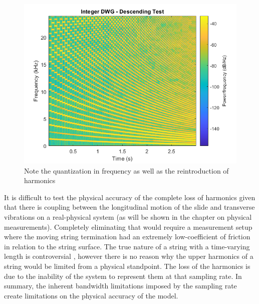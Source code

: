 \documentclass[../main.tex]{subfiles}
\begin{document}
\begin{figure}[h]
    \centering
    \includegraphics[scale=.65]{./images/plots/StringDWGIntDesc.png}
    \caption{Note the quantization in frequency as well as the reintroduction of harmonics}
    \label{fig:StringDWGIntDesc}
\end{figure}

It is difficult to test the physical accuracy of the complete loss of harmonics given that there is coupling between the longitudinal motion of the slide and transverse vibrations on a real-physical system (as will be shown in the chapter on physical measurements). Completely eliminating that would require a measurement setup where the moving string termination had an extremely low-coefficient of friction in relation to the string surface. The true nature of a string with a time-varying length is controversial , however there is no reason why the upper harmonics of a string would be limited from a physical standpoint. The loss of the harmonics is due to the inability of the system to represent them at that sampling rate. In summary, the inherent bandwidth limitations imposed by the sampling rate create limitations on the physical accuracy of the model.
\end{document}
